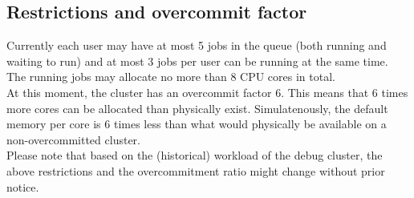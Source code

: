 \subsection{Restrictions and overcommit factor}
\label{subsec:debug_ugent_restrictions}

Currently each user may have at most 5 jobs in the queue (both running and waiting to run)
and at most 3 jobs per user can be running at the same time. The running jobs may allocate 
no more than 8 CPU cores in total. \\
At this moment, the cluster has an overcommit factor 6.  This means that 6 times more cores
can be allocated than physically exist. Simulatenously, the default memory per core is 6
times less than what would physically be available on a non-overcommitted cluster. \\
Please note that based on the (historical) workload of the debug cluster, the above restrictions
and the overcommitment ratio might change without prior notice.
